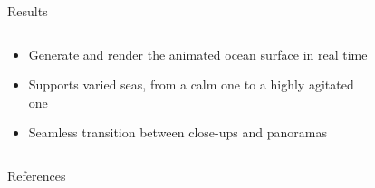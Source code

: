 \documentclass[final,hyperref={pdfpagelabels=true}]{beamer}
\begin{document}
\begin{frame}[fragile]
\begin{center}
\begin{minipage}{\textwidth}
		\begin{block}{Results}
			\begin{columns}[t]
				\begin{column}{0.4\linewidth}
				\begin{itemize}
				\item Generate and render the animated ocean surface in real time
				\item Supports varied seas, from a calm one to a highly agitated one
				\item Seamless transition between close-ups and panoramas
				\end{itemize}
				\end{column}
				\begin{column}{0.5\linewidth}
				\begin{figure}
				\hfill
				\hfill
				\end{figure}
				\end{column}
			\end{columns}
		\end{block}
	\end{minipage}
	\begin{minipage}{\textwidth}
		\begin{block}{References}

\end{block}
\end{minipage}
\end{center}
\end{frame}
\end{document}
